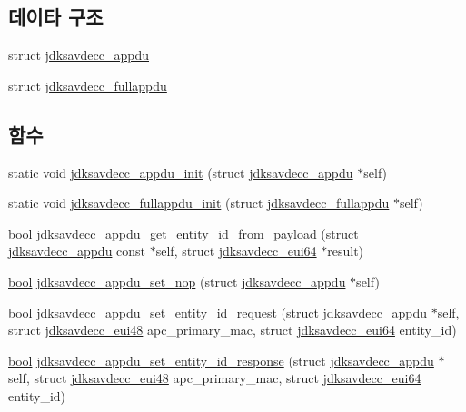 \subsection*{데이타 구조}
\begin{DoxyCompactItemize}
\item 
struct \hyperlink{structjdksavdecc__appdu}{jdksavdecc\+\_\+appdu}
\item 
struct \hyperlink{structjdksavdecc__fullappdu}{jdksavdecc\+\_\+fullappdu}
\end{DoxyCompactItemize}
\subsection*{함수}
\begin{DoxyCompactItemize}
\item 
static void \hyperlink{group__app_ga1c0c5be0d3d34c0e8ed0198864013903}{jdksavdecc\+\_\+appdu\+\_\+init} (struct \hyperlink{structjdksavdecc__appdu}{jdksavdecc\+\_\+appdu} $\ast$self)
\item 
static void \hyperlink{group__app_ga8997e8720b3c951b449508656e03eff9}{jdksavdecc\+\_\+fullappdu\+\_\+init} (struct \hyperlink{structjdksavdecc__fullappdu}{jdksavdecc\+\_\+fullappdu} $\ast$self)
\item 
\hyperlink{avb__gptp_8h_af6a258d8f3ee5206d682d799316314b1}{bool} \hyperlink{group__app_ga8e185f7f6f72d610f5d91deeb8e44139}{jdksavdecc\+\_\+appdu\+\_\+get\+\_\+entity\+\_\+id\+\_\+from\+\_\+payload} (struct \hyperlink{structjdksavdecc__appdu}{jdksavdecc\+\_\+appdu} const $\ast$self, struct \hyperlink{structjdksavdecc__eui64}{jdksavdecc\+\_\+eui64} $\ast$result)
\item 
\hyperlink{avb__gptp_8h_af6a258d8f3ee5206d682d799316314b1}{bool} \hyperlink{group__app_ga52e522c2aef1022cff142ea52856dc15}{jdksavdecc\+\_\+appdu\+\_\+set\+\_\+nop} (struct \hyperlink{structjdksavdecc__appdu}{jdksavdecc\+\_\+appdu} $\ast$self)
\item 
\hyperlink{avb__gptp_8h_af6a258d8f3ee5206d682d799316314b1}{bool} \hyperlink{group__app_ga4cb956f2bf8e2ba60fb699eaf87496b0}{jdksavdecc\+\_\+appdu\+\_\+set\+\_\+entity\+\_\+id\+\_\+request} (struct \hyperlink{structjdksavdecc__appdu}{jdksavdecc\+\_\+appdu} $\ast$self, struct \hyperlink{structjdksavdecc__eui48}{jdksavdecc\+\_\+eui48} apc\+\_\+primary\+\_\+mac, struct \hyperlink{structjdksavdecc__eui64}{jdksavdecc\+\_\+eui64} entity\+\_\+id)
\item 
\hyperlink{avb__gptp_8h_af6a258d8f3ee5206d682d799316314b1}{bool} \hyperlink{group__app_gac2f8266a5decad56667103adf1426b6f}{jdksavdecc\+\_\+appdu\+\_\+set\+\_\+entity\+\_\+id\+\_\+response} (struct \hyperlink{structjdksavdecc__appdu}{jdksavdecc\+\_\+appdu} $\ast$self, struct \hyperlink{structjdksavdecc__eui48}{jdksavdecc\+\_\+eui48} apc\+\_\+primary\+\_\+mac, struct \hyperlink{structjdksavdecc__eui64}{jdksavdecc\+\_\+eui64} entity\+\_\+id)

\end{DoxyCompactItemize}
